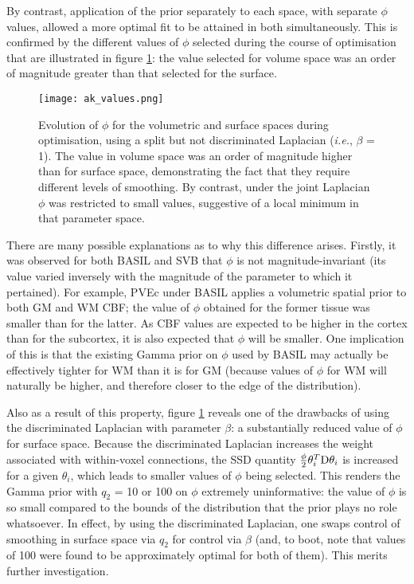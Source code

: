 By contrast, application of the prior separately to each space, with separate $\phi$ values, allowed a more optimal fit to be attained in both simultaneously. This is confirmed by the different values of $\phi$ selected during the course of optimisation that are illustrated in figure \ref{ak_values}: the value selected for volume space was an order of magnitude greater than that selected for the surface. 

\begin{figure}[H]
\centering
\texttt{[image: ak\_values.png]}
\caption{Evolution of $\phi$ for the volumetric and surface spaces during optimisation, using a split but not discriminated Laplacian (\textit{i.e.}, $\beta$ = 1). The value in volume space was an order of magnitude higher than for surface space, demonstrating the fact that they require different levels of smoothing. By contrast, under the joint Laplacian $\phi$ was restricted to small values, suggestive of a local minimum in that parameter space.}
\label{ak_values} 
\end{figure}

There are many possible explanations as to why this difference arises. Firstly, it was observed for both BASIL and SVB that $\phi$ is not magnitude-invariant (its value varied inversely with the magnitude of the parameter to which it pertained). For example, PVEc under BASIL applies a volumetric spatial prior to both GM and WM CBF; the value of $\phi$ obtained for the former tissue was smaller than for the latter. As CBF values are expected to be higher in the cortex than for the subcortex, it is also expected that $\phi$ will be smaller. One implication of this is that the existing Gamma prior on $\phi$ used by BASIL may actually be effectively tighter for WM than it is for GM (because values of $\phi$ for WM will naturally be higher, and therefore closer to the edge of the distribution). 

Also as a result of this property, figure \ref{ak_values} reveals one of the drawbacks of using the discriminated Laplacian with parameter $\beta$: a substantially reduced value of $\phi$ for surface space. Because the discriminated Laplacian increases the weight associated with within-voxel connections, the SSD quantity $\frac{\phi}{2}\theta_i^T\mathrm{D}\theta_i$ is increased for a given $\theta_i$, which leads to smaller values of $\phi$ being selected. This renders the Gamma prior with $q_2$ = 10 or 100 on $\phi$ extremely uninformative: the value of $\phi$ is so small compared to the bounds of the distribution that the prior plays no role whatsoever. In effect, by using the discriminated Laplacian, one swaps control of smoothing in surface space via $q_2$ for control via $\beta$ (and, to boot, note that values of 100 were found to be approximately optimal for both of them). This merits further investigation. 

